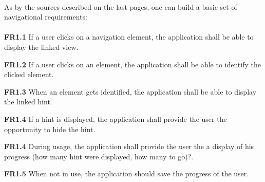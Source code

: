 \paragraph{}
As by the sources described on the last pages, one can build a basic set of navigational requirements:
\paragraph{}
\begin{closeItem}
    \item [\textbf{FR1.1}] If a user clicks on a navigation element, the application shall be able to display the linked view.
    \item [\textbf{FR1.2}] If a user clicks on an element, the application shall be able to identify the clicked element.
    \item [\textbf{FR1.3}] When an element gets identified, the application shall be able to display the linked hint.
    \item [\textbf{FR1.4}] If a hint is displayed, the application shall provide the user the opportunity to hide the hint.
    \item [\textbf{FR1.4}] During usage, the application shall provide the user the a display of his progress (how many hint were displayed, how many to go)?.
    \item [\textbf{FR1.5}] When not in use, the application should save the progress of the user.
\end{closeItem}

